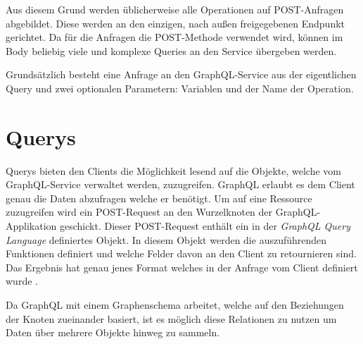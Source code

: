 Aus diesem Grund werden üblicherweise alle Operationen auf POST-Anfragen abgebildet.
Diese werden an den einzigen, nach außen freigegebenen Endpunkt gerichtet.
Da für die Anfragen die POST-Methode verwendet wird, können im Body beliebig viele und komplexe Queries an den Service übergeben werden.
\newline

Grundsätzlich besteht eine Anfrage an den GraphQL-Service aus der eigentlichen Query und zwei optionalen Parametern: Variablen und der Name der Operation.




\section{Querys}

Querys bieten den Clients die Möglichkeit lesend auf die Objekte, welche vom GraphQL-Service verwaltet werden, zuzugreifen.
GraphQL erlaubt es dem Client genau die Daten abzufragen welche er benötigt.
Um auf eine Ressource zuzugreifen wird ein POST-Request an den Wurzelknoten der GraphQL-Applikation geschickt.
Dieser POST-Request enthält ein in der \textit{GraphQL Query Language} definiertes Objekt.
In diesem Objekt werden die auszuführenden Funktionen definiert und welche Felder davon an den Client zu retournieren sind.
Das Ergebnis hat genau jenes Format welches in der Anfrage vom Client definiert wurde \cite[S.40-41]{kress2020graphql}.
\newline

Da GraphQL mit einem Graphenschema arbeitet, welche auf den Beziehungen der Knoten zueinander basiert, ist es möglich diese Relationen zu nutzen um Daten über mehrere Objekte hinweg zu sammeln.
\newline


